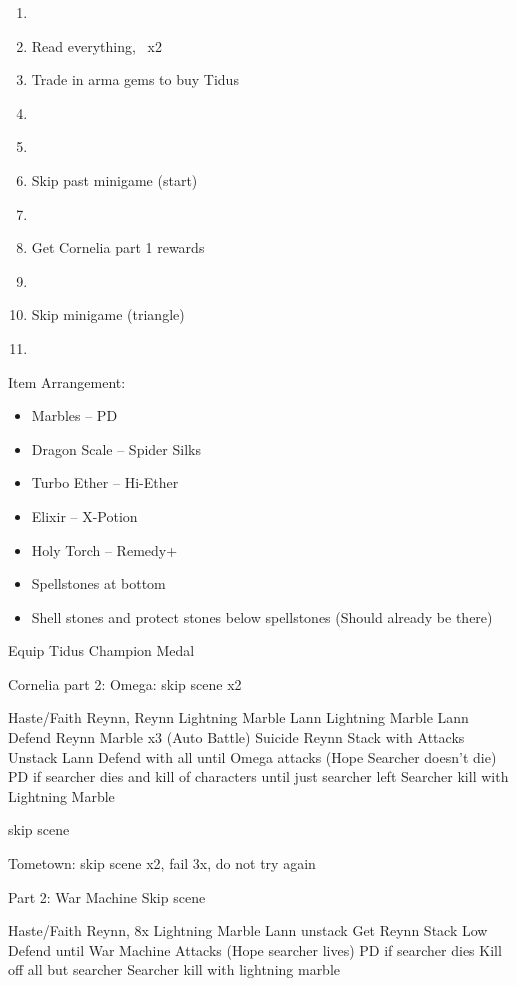 \begin{enumerate}
    \item \cs\ 
    \item Read everything, \cs\ x2
    \item Trade in arma gems to buy Tidus
    \item \cs\
    \item \cs\
    \item Skip past minigame (start)
    \item \cs\
    \item Get Cornelia part 1 rewards
    \item \cs\
    \item Skip minigame (triangle)
    \item \cs\
\end{enumerate}

\begin{menu}
    Item Arrangement:
    \begin{itemize}
        \item Marbles	--	 PD
        \item Dragon Scale	-- 	Spider Silks
        \item Turbo Ether	--	Hi-Ether
        \item Elixir		--	X-Potion
        \item Holy Torch	--	Remedy+
        \item Spellstones at bottom
        \item Shell stones and protect stones below spellstones (Should already be there)
    \end{itemize}
    \item Equip Tidus Champion Medal
\end{menu}

Cornelia part 2: Omega: 
skip scene x2

Haste/Faith Reynn,
Reynn Lightning Marble
Lann Lightning Marble
Lann Defend
Reynn Marble x3 (Auto Battle)
Suicide Reynn Stack with Attacks
Unstack Lann
Defend with all until Omega attacks (Hope Searcher doesn’t die)
PD if searcher dies and kill of characters until just searcher left
Searcher kill with Lightning Marble

skip scene

Tometown: 
skip scene x2, fail 3x, do not try again

Part 2: War Machine
Skip scene

Haste/Faith Reynn, 
8x Lightning Marble
Lann unstack
Get Reynn Stack Low
Defend until War Machine Attacks (Hope searcher lives)
PD if searcher dies
Kill off all but searcher
Searcher kill with lightning marble

